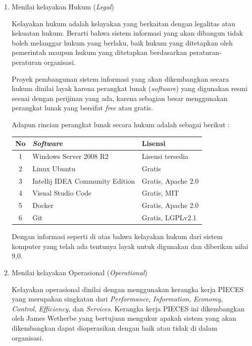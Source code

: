\documentclass[pdftex,12pt, oneside]{article}
\begin{document}
\begin{enumerate}
\begin{enumerate}
\end{enumerate}

	\item Menilai kelayakan Hukum (\textit{Legal})
	
Kelayakan hukum adalah kelayakan yang berkaitan dengan legalitas atau kekuatan hukum. Berarti bahwa sistem informasi yang akan dibangun tidak boleh melanggar hukum yang berlaku, baik hukum yang ditetapkan oleh pemerintah maupun hukum yang ditetapkan berdasarkan peraturan-peraturan organisasi. 

Proyek pembangunan sistem informasi yang akan dikembangkan secara hukum dinilai layak karena perangkat lunak (\textit{software}) yang digunakan resmi sesuai dengan perijinan yang ada, karena sebagian besar menggunakan perangkat lunak yang bersifat \textit{free} atau gratis.

Adapun rincian perangkat lunak secara hukum adalah sebagai berikut :

\begin{table}[H]
\centering
\begin{tabular}{| c | l | l |}
	\hline
	No & \textit{Software} & Lisensi \\
	\hline
	1 & Windows Server 2008 R2 & Lisensi tersedia \\
	\hline
	2 & Linux Ubuntu & Gratis \\
	\hline
	3 & Intellij IDEA Community Edition & Gratis, Apache 2.0 \\
	\hline
	4 & Visual Studio Code & Gratis, MIT \\
	\hline
	5 & Docker & Gratis, Apache 2.0 \\
	\hline
	6 & Git & Gratis, LGPLv2.1 \\ 
	\hline
	
\end{tabular}
\end{table}

Dengan informasi seperti di atas bahwa kelayakan hukum dari sistem komputer yang telah ada tentunya layak untuk digunakan dan diberikan nilai 9,0.

	\item Menilai kelayakan Operasional (\textit{Operational})
		
Kelayakan operasional dinilai dengan menggunakan kerangka kerja PIECES yang merupakan singkatan dari \textit{Performance}, \textit{Information}, \textit{Economy}, \textit{Control}, \textit{Efficiency}, dan \textit{Services}. Kerangka kerja PIECES ini dikembangkan oleh James Wetherbe yang bertujuan mengukur apakah sistem yang akan dikembangkan dapat dioperasikan dengan baik atau tidak di dalam organisasi.


\end{enumerate}
\end{document}
